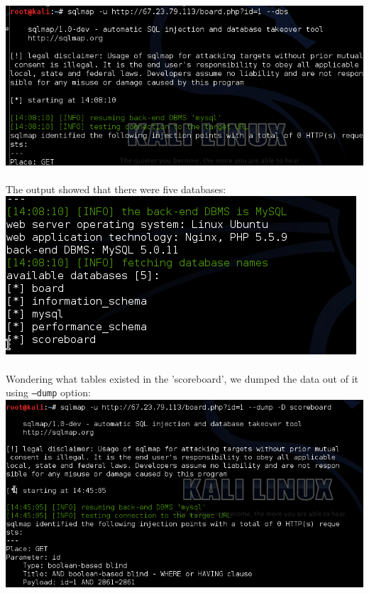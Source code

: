 \documentclass[12pt]{article}
\begin{document}
\begin{enumerate}[1.]
\includegraphics[scale=0.55]{images/flag8a} \\ \\

The output showed that there were five databases: \\

\includegraphics[scale=0.7]{images/flag8b} \\ \\

Wondering what tables existed in the 'scoreboard', we dumped the data out of it using \texttt{--dump} option: \\

\includegraphics[scale=0.55]{images/extra1} \\ \\


\end{enumerate}
\end{document}
